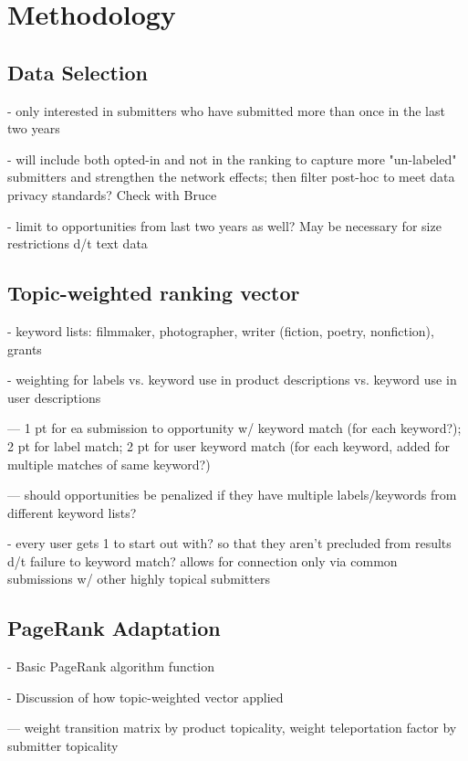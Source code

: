 \documentclass[]{report}   %
\begin{document}
\chapter{Methodology}

\section{Data Selection}

- only interested in submitters who have submitted more than once in the last two years

- will include both opted-in and not in the ranking to capture more "un-labeled" submitters and strengthen the network effects; then filter post-hoc to meet data privacy standards? Check with Bruce

- limit to opportunities from last two years as well? May be necessary for size restrictions d/t text data

\section{Topic-weighted ranking vector}

- keyword lists: filmmaker, photographer, writer (fiction, poetry, nonfiction), grants

- weighting for labels vs. keyword use in product descriptions vs. keyword use in user descriptions

--- 1 pt for ea submission to opportunity w/ keyword match (for each keyword?); 2 pt for label match; 2 pt for user keyword match (for each keyword, added for multiple matches of same keyword?)

--- should opportunities be penalized if they have multiple labels/keywords from different keyword lists?

- every user gets 1 to start out with? so that they aren't precluded from results d/t failure to keyword match? allows for connection only via common submissions w/ other highly topical submitters

\section{PageRank Adaptation}

- Basic PageRank algorithm function

- Discussion of how topic-weighted vector applied

--- weight transition matrix by product topicality, weight teleportation factor by submitter topicality
\end{document}
